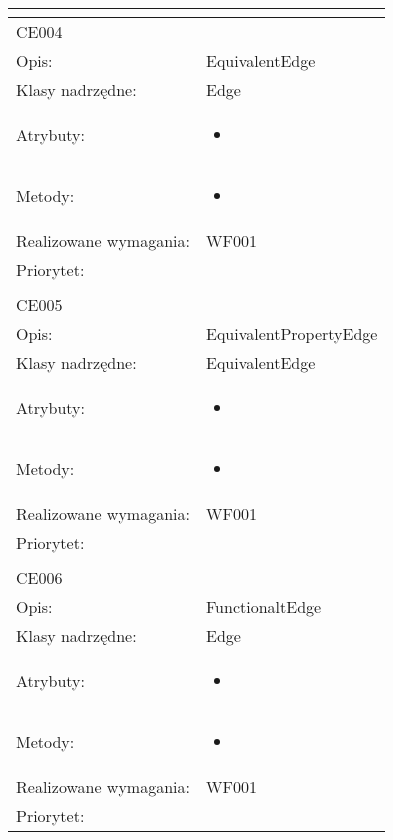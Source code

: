 \documentclass[a4paper,10pt]{article}
\begin{document}
\begin{center}
\begin{longtable}{|m{3cm}|m{9cm}|}
\multicolumn{2}{c}{} \\
 \hline

CE004 &  \\ \hline
Opis: & EquivalentEdge    \\ \hline
Klasy nadrzędne: & Edge    \\ \hline
Atrybuty: & \begin{itemize}
 \item 
\end{itemize}
 \\ \hline
Metody: & \begin{itemize}
 \item 
\end{itemize}
  \\ \hline
Realizowane wymagania: & WF001 \\ \hline
Priorytet: &  \\ \hline

\multicolumn{2}{c}{} \\
 \hline

CE005 &  \\ \hline
Opis: & EquivalentPropertyEdge    \\ \hline
Klasy nadrzędne: & EquivalentEdge    \\ \hline
Atrybuty: & \begin{itemize}
 \item 
\end{itemize}
 \\ \hline
Metody: & \begin{itemize}
 \item 
\end{itemize}
  \\ \hline
Realizowane wymagania: & WF001 \\ \hline
Priorytet: &  \\ \hline

\multicolumn{2}{c}{} \\
 \hline

CE006 &  \\ \hline
Opis: & FunctionaltEdge    \\ \hline
Klasy nadrzędne: & Edge    \\ \hline
Atrybuty: & \begin{itemize}
 \item 
\end{itemize}
 \\ \hline
Metody: & \begin{itemize}
 \item 
\end{itemize}
  \\ \hline
Realizowane wymagania: & WF001 \\ \hline
Priorytet: &  \\ \hline


\end{longtable}
\end{center}
\end{document}
